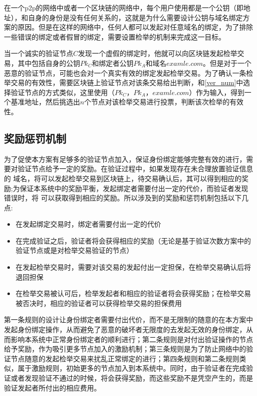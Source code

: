 在一个p2p的网络中或者一个区块链的网络中，每个用户使用都是一个公钥（即地址），和自身的身份是没有任何关系的，这就是为什么需要设计公钥与域名绑定方案的原因。但是在这样的网络中，任何人都可以发起对任意域名的绑定，为了排除一些错误的绑定或者假冒的绑定，需要设置检举的机制来完成这一目标。

当一个诚实的验证节点$C$发现一个虚假的绑定时，他就可以向区块链发起检举交易，其中包括自身的公钥$Pk_C$和绑定者公钥$Pk_A$和域名$examle.com$。但是对于一个恶意的验证节点，可能也会对一个真实有效的绑定发起检举交易。为了确认一条检举交易的有效性，需要区块链上验证节点对该条交易给出判断，和\ref{ver_num}中选择验证节点的方式类似，这里使用（$Pk_C$，$Pk_A$，$examle.com$）作为输入，得到一个基准地址，然后挑选出$n$个节点对该检举交易进行投票，判断该次检举的有效性。


\subsection{奖励惩罚机制}

为了促使本方案有足够多的验证节点加入，保证身份绑定能够完整有效的进行，需要对验证节点给予一定的奖励。在验证过程中，如果发现存在未合理放置验证信息的 域名，将可以发起检举交易到区块链上，待交易确认后，其可以得到相应的奖励;为保证本系统中的奖励平衡，发起绑定者需要付出一定的代价，而验证者发现错误时，将 可以获取得到相应的奖励。所以涉及到的奖励和惩罚机制包括以下几点:

\begin{itemize}
	\item 在发起绑定交易时，绑定者需要付出一定的代价
	\item 在完成验证之后，验证者将会获得相应的奖励（无论是基于验证次数方案中的验证节点或是对检举交易验证的节点）
	\item 在发起检举交易时，需要对该交易的发起付出一定担保，在检举交易确认后将退回担保
	\item 在检举交易被认可后，检举发起者和相应的验证者将会获得奖励；在检举交易被否决时，相应的验证者可以获得检举交易的担保费用
\end{itemize}

第一条规则的设计让身份绑定者需要付出代价，而不是无限制的随意的在本方案中发起身份绑定操作，从而避免了恶意的破坏者无限度的去发起无效的身份绑定，从而影响本系统中正常身份绑定者的顺利进行；第二条规则是对付出验证操作的节点给予奖励，作为吸引更多节点加入的激励机制；第三条规则是为了防止网络中的验证节点随意的发起检举交易来扰乱正常绑定的进行；第四条规则和第二条规则类似，属于激励规则，初始更多的节点加入到本系统中。同时，由于验证者在完成验证或者发现验证不通过的时候，将会获得奖励，而这些奖励不是凭空产生的，而是验证发起者所付出的相应费用。


